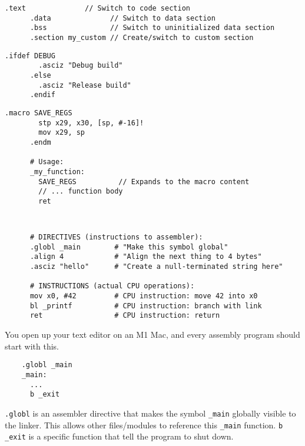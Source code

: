   \begin{example}
    \begin{lstlisting}[language=assembly]
      .text              // Switch to code section
      .data              // Switch to data section
      .bss               // Switch to uninitialized data section
      .section my_custom // Create/switch to custom section
    \end{lstlisting}
  \end{example}

  \begin{example}
    \begin{lstlisting}[language=assembly]
      .ifdef DEBUG
        .asciz "Debug build"
      .else  
        .asciz "Release build"
      .endif
    \end{lstlisting}
  \end{example}

  \begin{example}[Macros]
    \begin{lstlisting}[language=assembly]
      .macro SAVE_REGS
        stp x29, x30, [sp, #-16]!
        mov x29, sp
      .endm

      # Usage:
      _my_function:
        SAVE_REGS          // Expands to the macro content
        // ... function body
        ret
    \end{lstlisting}
  \end{example}

  \begin{example}[]
    \begin{lstlisting}
      
    \end{lstlisting}
  \end{example}

  \begin{example}
    
    \begin{lstlisting}
      # DIRECTIVES (instructions to assembler):
      .globl _main        # "Make this symbol global"
      .align 4            # "Align the next thing to 4 bytes"
      .asciz "hello"      # "Create a null-terminated string here"

      # INSTRUCTIONS (actual CPU operations):
      mov x0, #42         # CPU instruction: move 42 into x0
      bl _printf          # CPU instruction: branch with link
      ret                 # CPU instruction: return 
    \end{lstlisting}
  \end{example}


  You open up your text editor on an M1 Mac, and every assembly program should start with this. 

  \begin{lstlisting}
    .globl _main
    _main:
      ...
      b _exit
  \end{lstlisting}
  
  \texttt{.globl} is an assembler directive that makes the symbol \texttt{\_main} globally visible to the linker. This allows other files/modules to reference this \texttt{\_main} function. \texttt{b \_exit} is a specific function that tell the program to shut down. 

